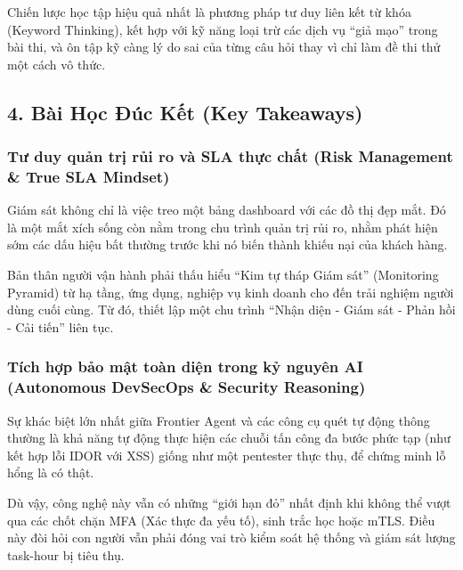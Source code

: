 Chiến lược học tập hiệu quả nhất là phương pháp tư duy liên kết từ khóa
(Keyword Thinking), kết hợp với kỹ năng loại trừ các dịch vụ ``giả mạo''
trong bài thi, và ôn tập kỹ càng lý do sai của từng câu hỏi thay vì chỉ
làm đề thi thử một cách vô thức.

\hypertarget{buxe0i-hux1ecdc-ux111uxfac-kux1ebft-key-takeaways}{%
\subsection{4. Bài Học Đúc Kết (Key
Takeaways)}}

\hypertarget{tux1b0-duy-quux1ea3n-trux1ecb-rux1ee7i-ro-vuxe0-sla-thux1ef1c-chux1ea5t-risk-management-true-sla-mindset}{%
\subsubsection{Tư duy quản trị rủi ro và SLA thực chất (Risk Management
\& True SLA
Mindset)}}

Giám sát không chỉ là việc treo một bảng dashboard với các đồ thị đẹp
mắt. Đó là một mắt xích sống còn nằm trong chu trình quản trị rủi ro,
nhằm phát hiện sớm các dấu hiệu bất thường trước khi nó biến thành khiếu
nại của khách hàng.

Bản thân người vận hành phải thấu hiểu ``Kim tự tháp Giám sát''
(Monitoring Pyramid) từ hạ tầng, ứng dụng, nghiệp vụ kinh doanh cho đến
trải nghiệm người dùng cuối cùng. Từ đó, thiết lập một chu trình ``Nhận
diện - Giám sát - Phản hồi - Cải tiến'' liên tục.

\hypertarget{tuxedch-hux1ee3p-bux1ea3o-mux1eadt-touxe0n-diux1ec7n-trong-kux1ef7-nguyuxean-ai-autonomous-devsecops-security-reasoning}{%
\subsubsection{Tích hợp bảo mật toàn diện trong kỷ nguyên AI (Autonomous
DevSecOps \& Security
Reasoning)}}

Sự khác biệt lớn nhất giữa Frontier Agent và các công cụ quét tự động
thông thường là khả năng tự động thực hiện các chuỗi tấn công đa bước
phức tạp (như kết hợp lỗi IDOR với XSS) giống như một pentester thực
thụ, để chứng minh lỗ hổng là có thật.

Dù vậy, công nghệ này vẫn có những ``giới hạn đỏ'' nhất định khi không
thể vượt qua các chốt chặn MFA (Xác thực đa yếu tố), sinh trắc học hoặc
mTLS. Điều này đòi hỏi con người vẫn phải đóng vai trò kiểm soát hệ
thống và giám sát lượng task-hour bị tiêu thụ.


